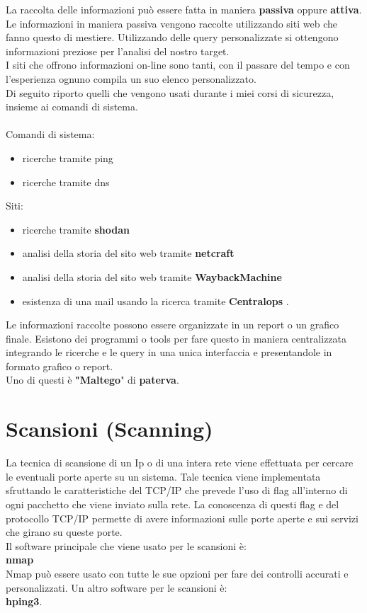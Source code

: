 La raccolta delle informazioni può essere fatta in maniera \textbf{passiva} oppure \textbf{attiva}. 
Le informazioni in maniera passiva vengono raccolte utilizzando siti web che fanno questo di mestiere. Utilizzando delle query personalizzate si ottengono informazioni preziose per l'analisi del nostro target. \\
I siti che offrono informazioni on-line sono tanti, con il passare del tempo e con l'esperienza ognuno compila un suo elenco personalizzato. \\ Di seguito riporto quelli che vengono usati durante i miei corsi di sicurezza, insieme ai comandi di sistema.\\ 
\\
Comandi di sistema:

\begin{itemize}
    \item ricerche tramite ping 
    \item ricerche tramite dns
\end{itemize}
Siti:
\begin{itemize}
    \item ricerche tramite \textbf{shodan} \cite{shodan}
    \item analisi della storia del sito web tramite \textbf{netcraft} \cite{netcraft}
    \item analisi della storia del sito web tramite \textbf{WaybackMachine} \cite{wayback}
    \item esistenza di una mail usando la ricerca tramite \textbf{Centralops} \cite{centralops}.
\end{itemize}

Le informazioni raccolte  possono essere organizzate in un report o un grafico finale. Esistono dei programmi o tools  per fare questo in maniera centralizzata integrando le ricerche e le query in una unica interfaccia e presentandole in formato grafico o report.
\\ Uno di questi è \textbf{"Maltego}"\cite{maltego} di \textbf{paterva}\cite{paterva}. 

\section{ Scansioni (Scanning) }

La tecnica di scansione di un Ip o di una intera rete viene effettuata per cercare le eventuali porte aperte su un sistema. Tale tecnica viene implementata sfruttando le caratteristiche del TCP/IP che prevede l'uso di flag all'interno di ogni pacchetto che viene inviato sulla rete. La conoscenza di questi flag e del protocollo TCP/IP permette di avere informazioni sulle porte aperte e sui servizi che girano su queste porte. \\
Il software principale che viene usato per le scansioni è: \\
\textbf{nmap}\cite{nmap} \\
Nmap può essere usato con tutte le sue opzioni per fare dei controlli accurati e personalizzati.
Un altro software per le scansioni è: \\
\textbf{ hping3}\cite{hping3}.

